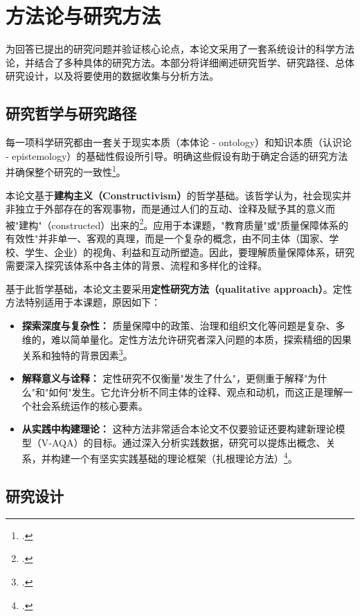 
\section{方法论与研究方法}
\label{sec:phuong_phap_luan}

为回答已提出的研究问题并验证核心论点，本论文采用了一套系统设计的科学方法论，并结合了多种具体的研究方法。本部分将详细阐述研究哲学、研究路径、总体研究设计，以及将要使用的数据收集与分析方法。

\subsection{研究哲学与研究路径}
\label{subsec:triet_ly_tiep_can}

每一项科学研究都由一套关于现实本质（本体论 - ontology）和知识本质（认识论 - epistemology）的基础性假设所引导。明确这些假设有助于确定合适的研究方法并确保整个研究的一致性\footcite{Creswell2018}。

本论文基于\textbf{建构主义（Constructivism）}的哲学基础。该哲学认为，社会现实并非独立于外部存在的客观事物，而是通过人们的互动、诠释及赋予其的意义而被"建构"（constructed）出来的\footcite{GubaLincoln1994}。应用于本课题，"教育质量"或"质量保障体系的有效性"并非单一、客观的真理，而是一个复杂的概念，由不同主体（国家、学校、学生、企业）的视角、利益和互动所塑造。因此，要理解质量保障体系，研究需要深入探究该体系中各主体的背景、流程和多样化的诠释。

基于此哲学基础，本论文主要采用\textbf{定性研究方法（qualitative approach）}。定性方法特别适用于本课题，原因如下：
\begin{itemize}
    \item \textbf{探索深度与复杂性：} 质量保障中的政策、治理和组织文化等问题是复杂、多维的，难以简单量化。定性方法允许研究者深入问题的本质，探索精细的因果关系和独特的背景因素\footcite{Yin2018}。
    \item \textbf{解释意义与诠释：} 定性研究不仅衡量"发生了什么"，更侧重于解释"为什么"和"如何"发生。它允许分析不同主体的诠释、观点和动机，而这正是理解一个社会系统运作的核心要素。
    \item \textbf{从实践中构建理论：} 这种方法非常适合本论文不仅要验证还要构建新理论模型（V-AQA）的目标。通过深入分析实践数据，研究可以提炼出概念、关系，并构建一个有坚实实践基础的理论框架（扎根理论方法）\footcite{Charmaz2006}。
\end{itemize}

\subsection{研究设计}
\label{subsec:thiet_ke_nghien_cuu}

